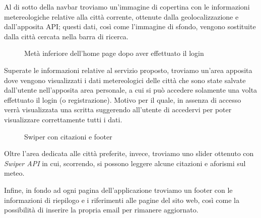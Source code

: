 \vspace{5mm}

Al di sotto della navbar troviamo un'immagine di copertina con le informazioni metereologiche relative alla città corrente, ottenute dalla geolocalizzazione e dall'apposita API;
questi dati, così come l'immagine di sfondo, vengono sostituite dalla città cercata nella barra di ricerca.

\begin{figure}[ht]
    \centering
    \caption{Metà inferiore dell'home page dopo aver effettuato il login}
\end{figure}

Superate le informazioni relative al servizio proposto, troviamo un'area apposita dove vengono visualizzati i dati metereologici delle città che sono state
salvate dall'utente nell'apposita area personale, a cui si può accedere solamente una volta effettuato il login (o registrazione). Motivo per il quale, in assenza di accesso verrà visualizzata una scritta
suggerendo all'utente di accedervi per poter visualizzare correttamente tutti i dati.

\begin{figure}[ht]
    \centering
    \caption{Swiper con citazioni e footer}
\end{figure}

Oltre l'area dedicata alle città preferite, invece, troviamo uno slider ottenuto con \emph{Swiper API} in cui, scorrendo, si possono leggere alcune citazioni e aforismi sul meteo.

\vspace{5mm}

Infine, in fondo ad ogni pagina dell'applicazione troviamo un footer con le informazioni di riepilogo e i riferimenti alle pagine del sito web, così come la possibilità di inserire la propria email per
rimanere aggiornato.

